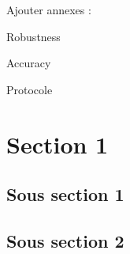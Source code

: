 \minitoc
\newpage


Ajouter annexes :

Robustness

Accuracy

Protocole



\section{Section 1}
\subsection{Sous section 1}
\blindtext
\subsection{Sous section 2}
\blindtext



